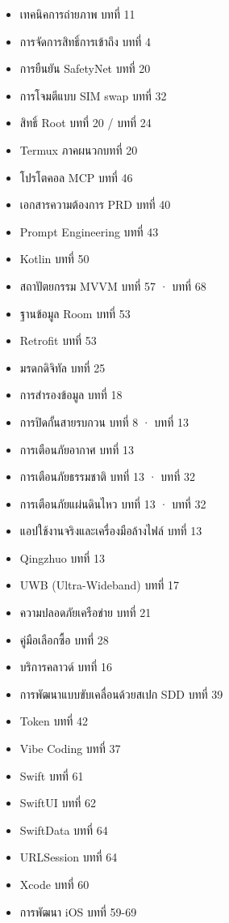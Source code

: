 
\begin{itemize}
  \item เทคนิคการถ่ายภาพ บทที่ 11
  \item การจัดการสิทธิ์การเข้าถึง บทที่ 4
  \item การยืนยัน SafetyNet บทที่ 20
  \item การโจมตีแบบ SIM swap บทที่ 32
  \item สิทธิ์ Root บทที่ 20 / บทที่ 24
  \item Termux ภาคผนวกบทที่ 20
  \item โปรโตคอล MCP บทที่ 46
  \item เอกสารความต้องการ PRD บทที่ 40
  \item Prompt Engineering บทที่ 43
  \item Kotlin บทที่ 50
  \item สถาปัตยกรรม MVVM บทที่ 57 · บทที่ 68
  \item ฐานข้อมูล Room บทที่ 53
  \item Retrofit บทที่ 53
\end{itemize}


\begin{itemize}
  \item มรดกดิจิทัล บทที่ 25
  \item การสำรองข้อมูล บทที่ 18
  \item การปิดกั้นสายรบกวน บทที่ 8 · บทที่ 13
  \item การเตือนภัยอากาศ บทที่ 13
  \item การเตือนภัยธรรมชาติ บทที่ 13 · บทที่ 32
  \item การเตือนภัยแผ่นดินไหว บทที่ 13 · บทที่ 32
  \item แอปใช้งานจริงและเครื่องมือล้างไฟล์ บทที่ 13
  \item Qingzhuo บทที่ 13
  \item UWB (Ultra-Wideband) บทที่ 17
  \item ความปลอดภัยเครือข่าย บทที่ 21
  \item คู่มือเลือกซื้อ บทที่ 28
  \item บริการคลาวด์ บทที่ 16
  \item การพัฒนาแบบขับเคลื่อนด้วยสเปก SDD บทที่ 39
  \item Token บทที่ 42
  \item Vibe Coding บทที่ 37
  \item Swift บทที่ 61
  \item SwiftUI บทที่ 62
  \item SwiftData บทที่ 64
  \item URLSession บทที่ 64
  \item Xcode บทที่ 60
  \item การพัฒนา iOS บทที่ 59-69
\end{itemize}

